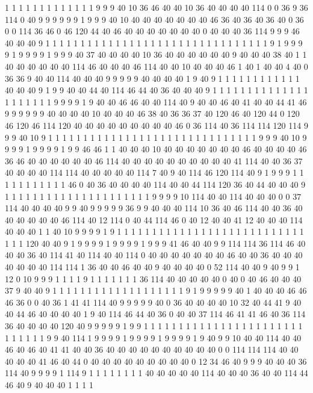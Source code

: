 1 1 1 1 1 1 1 1 1 1 1 1 1 9 9 9 40 10 36 46
40 40 10 36 40 40 40 40 114 0 0 36 9 36 114 0 40 9 9 9
9 9 9 1 9 9 9 40 10 40 40 40 40 40 40 40 46 36 40 36
40 36 40 0 36 0 0 114 36 46 0 46 120 44 40 46 40 40 40 40
40 40 40 0 40 40 40 36 114 9 9 9 46 40 40 40 9 1 1 1
1 1 1 1 1 1 1 1 1 1 1 1 1 1 1 1 1 1 1 1
1 1 1 1 1 1 1 1 1 9 1 9 9 9 9 1 9 9 9 9
1 9 9 9 40 37 40 40 40 40 10 36 40 40 40 40 40 40 9 40
40 40 38 40 1 1 40 40 40 40 40 40 114 46 40 40 40 46 114 40
40 10 40 40 40 46 1 40 1 40 40 4 40 0 36 36 9 40 40 114
40 40 40 9 9 9 9 9 40 40 40 40 1 9 40 9 1 1 1 1
1 1 1 1 1 1 1 1 40 40 40 9 1 9 9 40 40 44 40 114
46 44 40 36 40 40 40 9 1 1 1 1 1 1 1 1 1 1 1 1
1 1 1 1 1 1 1 1 1 9 9 9 9 1 9 40 40 46 46 40
40 114 40 9 40 40 46 40 41 40 40 44 41 46 9 9 9 9 9 9
40 40 40 40 10 40 40 40 46 38 40 36 36 37 40 120 46 40 120 44
0 120 46 120 46 114 120 40 40 40 40 40 40 40 40 40 46 0 36 114
40 36 114 114 120 114 9 9 9 40 10 9 1 1 1 1 1 1 1 1
1 1 1 1 1 1 1 1 1 1 1 1 1 1 1 1 1 1 1 1
1 1 9 9 9 40 10 9 9 9 9 1 9 9 9 9 1 9 9 46
46 1 1 40 40 40 10 40 40 40 40 40 40 40 46 40 40 40 40 46
36 46 40 40 40 40 40 40 46 114 40 40 40 40 40 40 40 40 40 40
41 114 40 40 36 37 40 40 40 40 114 114 40 40 40 40 40 114 7 40
9 40 114 46 120 114 40 9 1 9 9 9 1 1 1 1 1 1 1 1
1 1 1 46 0 40 36 40 40 40 40 114 40 40 44 114 120 36 40 44
40 40 40 9 1 1 1 1 1 1 1 1 1 1 1 1 1 1 1 1
1 1 1 1 1 9 9 9 9 10 114 40 40 114 40 40 40 0 0 37
114 40 40 40 40 9 9 40 9 9 9 9 9 36 9 9 40 40 40 114
10 36 40 46 114 40 40 36 40 40 40 40 40 40 46 114 40 12 114 0
40 44 114 46 0 40 12 40 40 41 12 40 40 40 114 40 40 40 1 1
40 10 9 9 9 9 1 9 1 1 1 1 1 1 1 1 1 1 1 1
1 1 1 1 1 1 1 1 1 1 1 1 1 1 1 1 1 1 120 40
40 9 1 9 9 9 9 1 9 9 9 9 1 9 9 9 41 46 40 40
9 9 114 114 36 114 46 40 40 40 36 40 114 41 40 114 40 40 114 0
40 40 40 40 40 40 40 46 40 40 36 40 40 40 40 40 40 40 114 114
1 36 40 40 46 40 40 9 40 40 40 40 0 52 114 40 40 9 40 9
9 1 12 0 10 9 9 9 1 1 1 1 9 1 1 1 1 1 1 1
36 114 40 40 40 40 40 0 40 0 40 46 40 40 40 37 9 40 40 9
1 1 1 1 1 1 1 1 1 1 1 1 1 1 1 1 1 1 1 9
1 9 9 9 9 9 40 1 40 40 40 46 46 46 36 0 0 40 36 1
41 41 114 40 9 9 9 9 9 40 0 36 40 40 40 40 10 32 40 44
41 9 40 40 44 46 40 40 40 40 1 9 40 114 46 44 40 36 0 40
40 37 114 46 41 41 46 40 36 114 36 40 40 40 40 120 40 9 9 9
9 9 1 9 9 1 1 1 1 1 1 1 1 1 1 1 1 1 1 1
1 1 1 1 1 1 1 1 1 1 1 1 1 1 9 9 40 114 1 9
9 9 9 1 9 9 9 9 1 9 9 9 9 1 9 40 9 9 10 40
40 114 40 40 46 40 46 40 41 41 40 40 36 40 40 40 40 40 40 40
40 40 40 0 0 114 114 114 40 40 40 40 40 41 46 40 44 0 40 40
40 40 40 40 40 40 40 0 12 34 46 40 9 9 9 40 40 40 36 114
40 9 9 9 9 1 114 9 1 1 1 1 1 1 1 1 40 40 40 40
40 114 40 40 40 36 40 40 114 44 46 40 9 40 40 40 1 1 1 1
